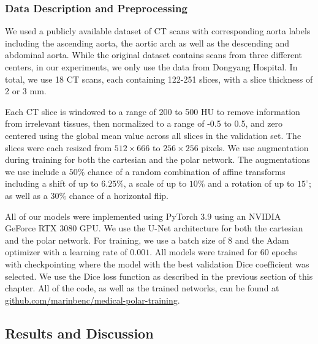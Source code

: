 \subsubsection{Data Description and Preprocessing}

We used a publicly available dataset of CT scans with corresponding aorta labels \cite{radlAVTMulticenterAortic2022} including the ascending aorta, the aortic arch as well as the descending and abdominal aorta. While the original dataset contains scans from three different centers, in our experiments, we only use the data from Dongyang Hospital. In total, we use 18 CT scans, each containing 122-251 slices, with a slice thickness of 2 or 3 mm.

Each CT slice is windowed to a range of 200 to 500 HU to remove information from irrelevant tissues, then normalized to a range of -0.5 to 0.5, and zero centered using the global mean value across all slices in the validation set. The slices were each resized from $512 \times 666$ to $256 \times 256$ pixels. We use augmentation during training for both the cartesian and the polar network. The augmentations we use include a $50\%$ chance of a random combination of affine transforms including a shift of up to $6.25\%$, a scale of up to $10\%$ and a rotation of up to $15^{\circ}$; as well as a $30\%$ chance of a horizontal flip.

All of our models were implemented using PyTorch 3.9 using an NVIDIA GeForce RTX 3080 GPU. We use the U-Net \cite{ronnebergerUNetConvolutionalNetworks2015d} architecture for both the cartesian and the polar network. For training, we use a batch size of 8 and the Adam optimizer with a learning rate of $0.001$. All models were trained for 60 epochs with checkpointing where the model with the best validation Dice coefficient was selected. We use the Dice loss function as described in the previous section of this chapter. All of the code, as well as the trained networks, can be found at \href{https://github.com/marinbenc/medical-polar-training}{github.com/marinbenc/medical-polar-training}.

\subsection{Results and Discussion}

